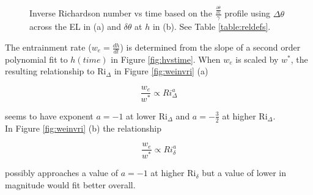 \begin{figure}[htbp]

\begin{minipage}[b]{0.5\linewidth}
         
        \\
        \end{minipage}             
\quad
\begin{minipage}[b]{0.5\linewidth}
        \\
       
       \end{minipage}
        \caption[Richardson numbers based on $\frac{\frac{\partial \overline{\theta}}{\partial z}}{\gamma}$]{Inverse Richardson number vs time based on the $\frac{\frac{\partial \overline{\theta}}{\partial z}}{\gamma}$
profile using $\Delta \theta$ across the \acs{EL} in (a) and $\delta \theta$ at $h$ in (b).  See Table \ref{table:reldefs}.}
        \label{fig:invristime}
\end{figure}

\clearpage

The entrainment rate ($w_{e}= \frac{dh}{dt}$) is determined from the slope of a second order polynomial fit to $h(time)$ in Figure \ref{fig:hvstime}.  When $w_{e}$ is scaled by $w^{*}$, the resulting relationship to \acs{Ri}$_{\Delta}$ 
in Figure \ref{fig:weinvri} (a) 

\begin{equation}
\frac{w_{e}}{w^{*}} \propto Ri_{\Delta}^{a}
\end{equation}

seems to have exponent $a = -1$ at lower \acs{Ri}$_{\Delta}$ and $a = -\frac{3}{2}$ at higher \acs{Ri}$_{\Delta}$.\\

In Figure \ref{fig:weinvri} (b) the relationship

\begin{equation}
\frac{w_{e}}{w^{*}} \propto Ri_{\delta}^{a}
\end{equation}

possibly approaches a value of $a = -1$ at higher \acs{Ri}$_{\delta}$ but a value of lower in magnitude would fit better overall. \\    

